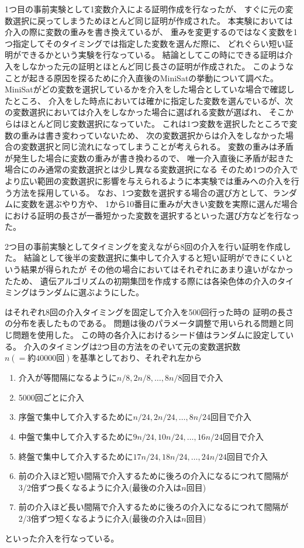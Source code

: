 1つ目の事前実験として1変数介入による証明作成を行なったが、
すぐに元の変数選択に戻ってしまうためほとんど同じ証明が作成された。
本実験においては介入の際に変数の重みを書き換えているが、
重みを変更するのではなく変数を1つ指定してそのタイミングでは指定した変数を選んだ際に、
どれぐらい短い証明ができるかという実験を行なっている。
結論としてこの時にできる証明は介入をしなかった元の証明とほとんど同じ長さの証明が作成された。
このようなことが起きる原因を探るために介入直後のMiniSatの挙動について調べた。
MiniSatがどの変数を選択しているかを介入をした場合としていな場合で確認したところ、
介入をした時点においては確かに指定した変数を選んでいるが、次の変数選択においては介入をしなかった場合に選ばれる変数が選ばれ、
そこからはほとんど同じ変数選択になっていた。
これは1つ変数を選択したところで変数の重みは書き変わっていないため、
次の変数選択からは介入をしなかった場合の変数選択と同じ流れになってしまうことが考えられる。
変数の重みは矛盾が発生した場合に変数の重みが書き換わるので、
唯一介入直後に矛盾が起きた場合にのみ通常の変数選択とは少し異なる変数選択になる
そのため1つの介入でより広い範囲の変数選択に影響を与えられるように本実験では重みへの介入を行う方法を採用している。
なお、1つ変数を選択する場合の選び方として、ランダムに変数を選ぶやり方や、
1から10番目に重みが大きい変数を実際に選んだ場合における証明の長さが一番短かった変数を選択するといった選び方などを行なった。


2つ目の事前実験としてタイミングを変えながら8回の介入を行い証明を作成した。
結論として後半の変数選択に集中して介入すると短い証明ができにくいという結果が得られたが
その他の場合においてはそれぞれにあまり違いがなかったため、
遺伝アルゴリズムの初期集団を作成する際には各染色体の介入のタイミングはランダムに選ぶようにした。


はそれぞれ8回の介入タイミングを固定して介入を500回行った時の
証明の長さの分布を表したものである。
問題は後のパラメータ調整で用いられる問題と同じ問題を使用した。
この時の各介入におけるシード値はランダムに設定している。
介入のタイミングは2つ目の方法をのぞいて元の変数選択数$n(={約}40000{回})$を基準としており、それぞれ左から
\begin{enumerate}
    \item 介入が等間隔になるように$n/8, 2n/8, \ldots, 8n/8$回目で介入
    \item 5000回ごとに介入
    \item 序盤で集中して介入するために$n/24, 2n/24, \ldots, 8n/24$回目で介入
    \item 中盤で集中して介入するために$9n/24, 10n/24, \ldots, 16n/24$回目で介入
    \item 終盤で集中して介入するために$17n/24, 18n/24, \ldots, 24n/24$回目で介入
    \item 前の介入ほど短い間隔で介入するために後ろの介入になるにつれて間隔が3/2倍ずつ長くなるように介入(最後の介入は$n$回目)
    \item 前の介入ほど長い間隔で介入するために後ろの介入になるにつれて間隔が2/3倍ずつ短くなるように介入(最後の介入は$n$回目)
\end{enumerate}
といった介入を行なっている。

